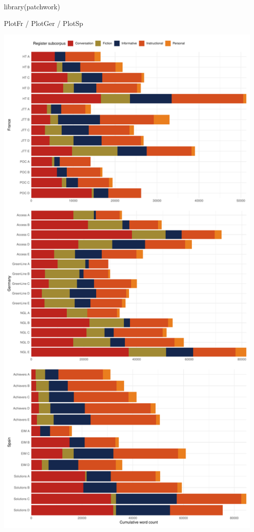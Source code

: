 \documentclass[
  letterpaper,
  DIV=11,
  numbers=noendperiod]{scrreprt}
\newenvironment{Shaded}{\begin{snugshade}}{\end{snugshade}}
\newcommand{\FunctionTok}[1]{\textcolor[rgb]{0.28,0.35,0.67}{#1}}
\newcommand{\NormalTok}[1]{\textcolor[rgb]{0.00,0.23,0.31}{#1}}
\newcommand{\SpecialCharTok}[1]{\textcolor[rgb]{0.37,0.37,0.37}{#1}}
\begin{document}
\begin{Shaded}
\begin{Highlighting}[]
\FunctionTok{library}\NormalTok{(patchwork)}

\NormalTok{PlotFr }\SpecialCharTok{/}
\NormalTok{PlotGer }\SpecialCharTok{/}
\NormalTok{PlotSp}
\end{Highlighting}
\end{Shaded}

\includegraphics{AppendixE_files/figure-pdf/TEC-metadata-1.pdf}
\end{document}
